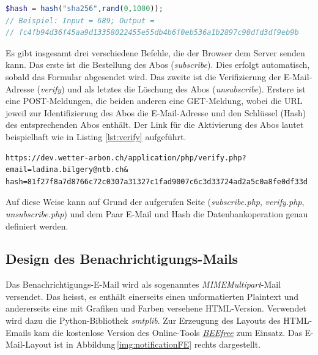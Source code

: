\vspace{3mm}
\begin{lstlisting}[label=lst:randomHash,caption=Funktion zur Erzeugung des eindeutigen Hash, language=php, style=php]
$hash = hash("sha256",rand(0,1000));
// Beispiel: Input = 689; Output =
// fc4fb94d36f45aa9d13358022455e55db4b6f0eb536a1b2897c90dfd3df9eb9b

\end{lstlisting}
\vspace{3mm}

\noindent
Es gibt insgesamt drei verschiedene Befehle, die der Browser dem Server senden kann. Das erste ist die Bestellung des Abos (\textit{subscribe}). Dies erfolgt automatisch, sobald das Formular abgesendet wird. Das zweite ist die Verifizierung der E-Mail-Adresse (\textit{verify}) und als letztes die Löschung des Abos (\textit{unsubscribe}). Erstere ist eine POST-Meldungen, die beiden anderen eine GET-Meldung, wobei die URL jeweil zur Identifizierung des Abos die E-Mail-Adresse und den Schlüssel (Hash) des entsprechenden Abos enthält. Der Link für die Aktivierung des Abos lautet beispielhaft wie in Listing \ref{lst:verify} aufgeführt.

\vspace{3mm}
\begin{lstlisting}[label=lst:verify,caption=Beispiellink für die Aktivierung eines Abos, language=HTML5, style=htmlcssjs]
https://dev.wetter-arbon.ch/application/php/verify.php?
email=ladina.bilgery@ntb.ch&
hash=81f27f8a7d8766c72c0307a31327c1fad9007c6c3d33724ad2a5c0a8fe0df33d
\end{lstlisting}
\vspace{3mm}

\noindent
Auf diese Weise kann auf Grund der aufgerufen Seite (\textit{subscribe.php}, \textit{verify.php}, \textit{unsubscribe.php}) und dem Paar E-Mail und Hash die Datenbankoperation genau definiert werden.

\subsection{Design des Benachrichtigungs-Mails}
Das Benachrichtigungs-E-Mail wird als sogenanntes \emph{MIMEMultipart}-Mail versendet. Das heisst, es enthält einerseits einen unformatierten Plaintext und andererseits eine mit Grafiken und Farben versehene HTML-Version. Verwendet wird dazu die Python-Bibliothek \emph{smtplib}. Zur Erzeugung des Layouts des HTML-Emails kam die kostenlose Version des Online-Tools \emph{\href{https://beefree.io/bee-free/}{BEEfree}} zum Einsatz. Das E-Mail-Layout ist in Abbildung\,\ref{img:notificationFE} rechts dargestellt.



